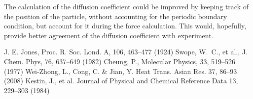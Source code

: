 \documentclass[]{article}
\begin{document}
The calculation of the diffusion coefficient could be improved by keeping track of the position of the particle, without accounting for the periodic boundary condition, but account for it during the force calculation.
This would, hopefully, provide better agreement of the diffusion coefficient with experiment.

\begin{thebibliography}{}
		J. E. Jones, Proc. R. Soc. Lond. A, 106, 463--477 (1924)
		Swope, W.~C., et al., J. Chem. Phys, 76, 637--649 (1982)
		Cheung, P., Molecular Physics, 33, 519--526 (1977)
		Wei-Zhong, L., Cong, C. \& Jian, Y. Heat Trans. Asian Res. 37, 86--93 (2008)
		Kestin, J., et al. Journal of Physical and Chemical Reference Data 13, 229--303 (1984)
\end{thebibliography}
\end{document}
